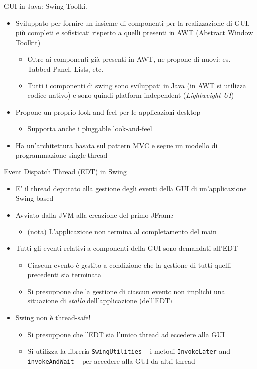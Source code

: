 \documentclass[presentation]{beamer}
\begin{document}
\begin{frame}{GUI in Java: Swing Toolkit}
\begin{itemize}\itemsep10pt
\item Sviluppato per fornire un insieme di componenti per la realizzazione di GUI, più completi e sofisticati rispetto a quelli presenti in AWT (Abstract Window Toolkit)
\begin{itemize}
\item Oltre ai componenti già presenti in AWT, ne propone di nuovi: es. Tabbed Panel, Lists, etc.
\item Tutti i componenti di swing sono sviluppati in Java (in AWT si utilizza codice nativo) e sono quindi platform-independent (\textit{Lightweight UI})
\end{itemize}
\item Propone un proprio look-and-feel per le applicazioni desktop
\begin{itemize}
\item Supporta anche i pluggable look-and-feel
\end{itemize}
\item Ha un'architettura basata sul pattern MVC e segue un modello di programmazione single-thread
\end{itemize}
\end{frame}


\begin{frame}{Event Dispatch Thread (EDT) in Swing}
\begin{itemize}\itemsep10pt
\item E' il thread deputato alla gestione degli eventi della GUI di un'applicazione Swing-based
\item Avviato dalla JVM alla creazione del primo JFrame
\begin{itemize}
\item (nota) L'applicazione non termina al completamento del main
\end{itemize}
\item Tutti gli eventi relativi a componenti della GUI sono demandati all'EDT
\begin{itemize}
\item Ciascun evento è gestito a condizione che la gestione di tutti quelli precedenti sia terminata
\item Si presuppone che la gestione di ciascun evento non implichi una situazione di \emph{stallo} dell'applicazione (dell'EDT)
\end{itemize}
\item Swing non è thread-safe!
\begin{itemize}
\item Si presuppone che l'EDT sia l'unico thread ad eccedere alla GUI
\item Si utilizza la libreria \texttt{SwingUtilities} -- i metodi \texttt{InvokeLater} and \texttt{invokeAndWait} -- per accedere alla GUI da altri thread
\end{itemize}
\end{itemize}
\end{frame}
\end{document}
